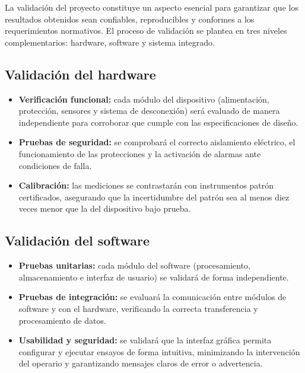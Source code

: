 \documentclass[a4paper,12pt]{article}
\begin{document}
La validación del proyecto constituye un aspecto esencial para garantizar que los resultados obtenidos sean confiables, reproducibles y conformes a los requerimientos normativos. El proceso de validación se plantea en tres niveles complementarios: hardware, software y sistema integrado.

\subsection{Validación del hardware}
\begin{itemize}
    \item \textbf{Verificación funcional:} cada módulo del dispositivo (alimentación, protección, sensores y sistema de desconexión) será evaluado de manera independiente para corroborar que cumple con las especificaciones de diseño.
    \item \textbf{Pruebas de seguridad:} se comprobará el correcto aislamiento eléctrico, el funcionamiento de las protecciones y la activación de alarmas ante condiciones de falla.
    \item \textbf{Calibración:} las mediciones se contrastarán con instrumentos patrón certificados, asegurando que la incertidumbre del patrón sea al menos diez veces menor que la del dispositivo bajo prueba.
\end{itemize}

\subsection{Validación del software}
\begin{itemize}
    \item \textbf{Pruebas unitarias:} cada módulo del software (procesamiento, almacenamiento e interfaz de usuario) se validará de forma independiente.
    \item \textbf{Pruebas de integración:} se evaluará la comunicación entre módulos de software y con el hardware, verificando la correcta transferencia y procesamiento de datos.
    \item \textbf{Usabilidad y seguridad:} se validará que la interfaz gráfica permita configurar y ejecutar ensayos de forma intuitiva, minimizando la intervención del operario y garantizando mensajes claros de error o advertencia.
\end{itemize}
\end{document}
